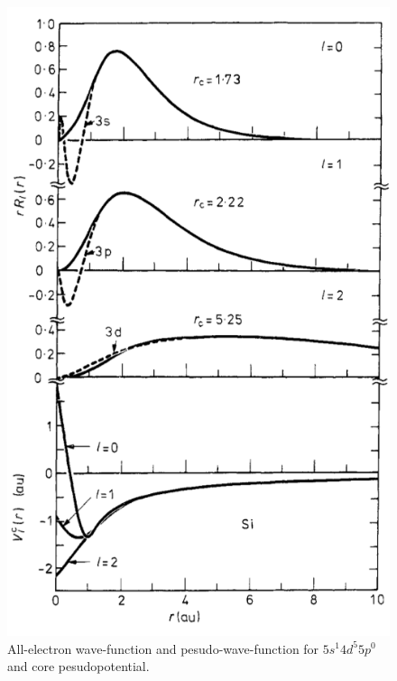 \begin{figure}[H]
	\centering
	\includegraphics[height=0.5\textheight]{images/kerkerfig1}
	\caption{All-electron wave-function and pesudo-wave-function for
		 $5s^1 4d^5 5p^0$ and core pesudopotential.\cite{Kerker:1980cs}}
	\label{fig:kerkerfig1}
\end{figure}














